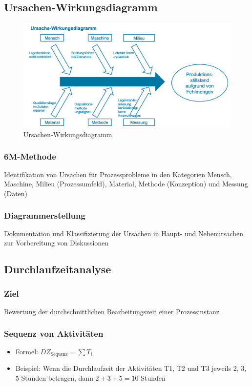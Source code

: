 \subsection{Ursachen-Wirkungsdiagramm}
    \begin{figure}[ht]
        \centering
        \includegraphics[width=\textwidth]{image/Ursachen-Wirkungsdiagramm.png}
        \caption{Ursachen-Wirkungsdiagramm}
        \label{fig:Ursachen-Wirkungsdiagramm}
    \end{figure}
    \subsubsection*{6M-Methode}
        Identifikation von Ursachen für Prozessprobleme in den Kategorien Mensch, Maschine, Milieu (Prozessumfeld), Material, Methode (Konzeption) und Messung (Daten)
    \subsubsection*{Diagrammerstellung}
        Dokumentation und Klassifizierung der Ursachen in Haupt- und Nebenursachen zur Vorbereitung von Diskussionen

\subsection{Durchlaufzeitanalyse}
    \subsubsection*{Ziel}
        Bewertung der durchschnittlichen Bearbeitungszeit einer Prozessinstanz
    \subsubsection*{Sequenz von Aktivitäten}
        \begin{itemize}
            \item Formel: $DZ_{\text{Sequenz}} = \sum T_i$
            \item Beispiel: Wenn die Durchlaufzeit der Aktivitäten T1, T2 und T3 jeweils 2, 3, 5 Stunden betragen, dann $2+3+5=10$ Stunden
        \end{itemize}
